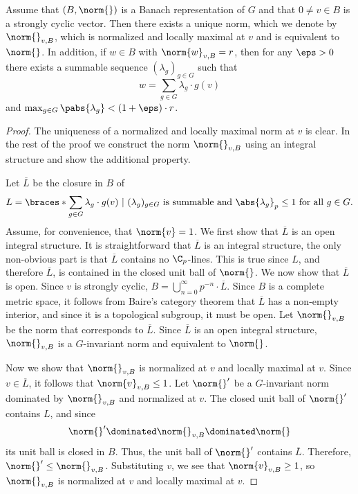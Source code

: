 \begin{lem}\label{lem_locally_maximal_from_strongly_cyclic}
Assume that $(B,\norm{})$ is a Banach representation of $G$ and that $0\neq v\in B$ is a strongly cyclic vector.
Then there exists a unique norm, which we denote by $\norm{}_{v,B}$, which is normalized and locally maximal at $v$ and is equivalent to $\norm{}$.
In addition, if $w\in B$ with $\norm{w}_{v,B}=r$, then for any $\eps>0$ there exists a summable sequence $(\lambda_g)_{g\in G}$ such that 
\[w=\sum_{g\in G}\lambda_g\cdot g(v)\]
and $\max_{g\in G}\pabs{\lambda_g}<(1+\eps)\cdot r$.
\end{lem} 

    \begin{proof}
    The uniqueness of a normalized and locally maximal norm at $v$ is clear.
    In the rest of the proof we construct the norm $\norm{}_{v,B}$ using an integral structure and show the additional property.
    
    Let $\overline{L}$ be the closure in $B$ of 
    \[L=\braces*{\sum_{g\in G}\lambda_g\cdot g(v)\ |\ (\lambda_g)_{g\in G} \text{ is summable and } \abs{\lambda_g}_p\leq 1 \text{ for all }g\in G}.\]
    Assume, for convenience, that $\norm{v}=1$. 
    We first show that $\overline{L}$ is an open integral structure.
    It is straightforward that $\overline{L}$ is an integral structure, the only non-obvious part is that $\overline{L}$ contains no $\C_p$-lines.
    This is true since $L$, and therefore $\overline{L}$, is contained in the closed unit ball of $\norm{}$.
    We now show that $\overline{L}$ is open.
    Since $v$ is strongly cyclic, $B=\bigcup_{n=0}^\infty p^{-n}\cdot \overline{L}$.
    Since $B$ is a complete metric space, it follows from Baire's category theorem that $\overline{L}$ has a non-empty interior, and since it is a topological subgroup, it must be open.
    Let $\norm{}_{v,B}$ be the norm that corresponds to $\overline{L}$.
    Since $\overline{L}$ is an open integral structure, $\norm{}_{v,B}$ is a $G$-invariant norm and equivalent to $\norm{}$.
    
    Now we show that $\norm{}_{v,B}$ is normalized at $v$ and locally maximal at $v$.
    Since $v\in \overline{L}$, it follows that $\norm{v}_{v,B}\leq 1$.
    Let $\norm{}'$ be a $G$-invariant norm dominated by $\norm{}_{v,B}$ and normalized at $v$.
    The closed unit ball of $\norm{}'$ contains $L$, and since
    \[\norm{}'\dominated\norm{}_{v,B}\dominated \norm{}\]
    its unit ball is closed in $B$.
    Thus, the unit ball of $\norm{}'$ contains $\overline{L}$.
    Therefore, $\norm{}'\leq \norm{}_{v,B}$.
    Substituting $v$, we see that $\norm{v}_{v,B}\geq 1$, so $\norm{}_{v,B}$ is normalized at $v$ and locally maximal at $v$.
    

\end{proof}
